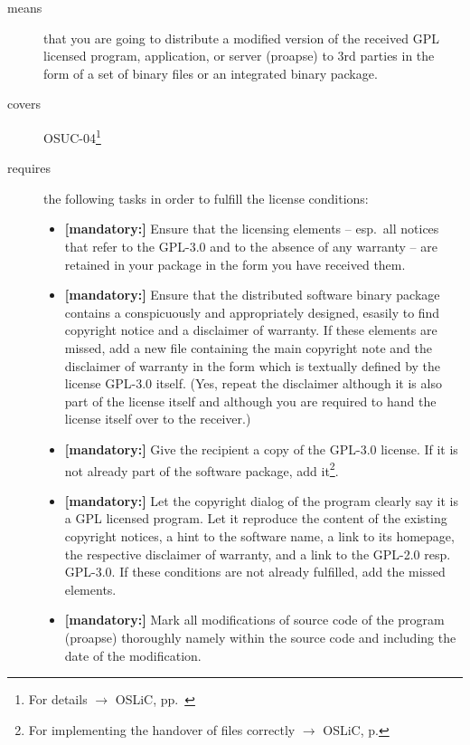 \begin{description}
\item[means] that you are going to distribute a modified version of the received
GPL licensed pro\-gram, application, or server (proapse) to 3rd parties in
the form of a set of binary files or an integrated binary package.
\item[covers] OSUC-04\footnote{For details $\rightarrow$ OSLiC, pp.\ \pageref{OSUC-04-DEF}}

\item[requires] the following tasks in order to fulfill the license conditions:
\begin{itemize}

  \item \textbf{[mandatory:]} Ensure that the licensing elements -- esp.\ all
  notices that refer to the GPL-3.0 and to the absence of any
  warranty -- are retained in your package in the form you have received them.

  \item \textbf{[mandatory:]} Ensure that the distributed software binary
  package contains a conspicuously and appropriately designed, esasily to find
  copyright notice and a disclaimer of warranty. If these elements are missed,
  add a new file containing the main copyright note and the disclaimer of
  warranty in the form which is textually defined by the license GPL-3.0 itself.
  (Yes, repeat the disclaimer although it is also part of the license itself and
  although you are required to hand the license itself over to the receiver.)
  
  \item \textbf{[mandatory:]} Give the recipient a copy of the GPL-3.0 license.
  If it is not already part of the software package, add it\footnote{For
  implementing the handover of files correctly $\rightarrow$ OSLiC, p.
  \pageref{DistributingFilesHint}}.

  \item \textbf{[mandatory:]} Let the copyright dialog of the program clearly
  say it is a GPL licensed program. Let it reproduce the content of the existing
  copyright notices, a hint to the software name, a link to its homepage, the
  respective disclaimer of warranty, and a link to the GPL-2.0 resp. GPL-3.0. If
  these conditions are not already fulfilled, add the missed elements.
  
  \item \textbf{[mandatory:]} Mark all modifications of source code of the
  program (proapse) thoroughly namely within the source code and including
  the date of the modification.
  

\end{itemize}
\end{description}
